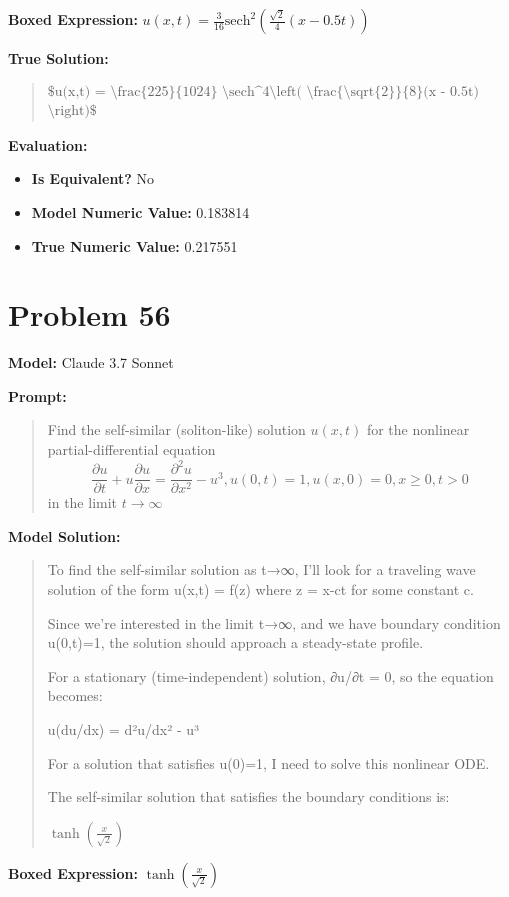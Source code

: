\documentclass{article}
\begin{document}
\textbf{Boxed Expression:} $u(x,t) = \frac{3}{16} \text{sech}^2\left(\frac{\sqrt{2}}{4}(x - 0.5t)\right)$

\textbf{True Solution:}
\begin{quote}
$u(x,t) = \frac{225}{1024} \sech^4\left( \frac{\sqrt{2}}{8}(x - 0.5t) \right)$
\end{quote}

\textbf{Evaluation:}
\begin{itemize}
\item \textbf{Is Equivalent?} No
\item \textbf{Model Numeric Value:} 0.183814
\item \textbf{True Numeric Value:} 0.217551
\end{itemize}
\vspace{1cm}
\section*{Problem 56}
\textbf{Model:} Claude 3.7 Sonnet

\textbf{Prompt:}
\begin{quote}
Find the self-similar (soliton-like) solution $u(x,t)$ for the nonlinear partial-differential equation $$ \frac{\partial u}{\partial t} + u\frac{\partial u}{\partial x} = \frac{\partial^2 u}{\partial x^2} - u^3, u(0,t)=1, u(x,0)=0, x\ge 0, t>0 $$ in the limit $t\to\infty$
\end{quote}
\textbf{Model Solution:}
\begin{quote}
To find the self-similar solution as t→∞, I'll look for a traveling wave solution of the form u(x,t) = f(z) where z = x-ct for some constant c.



Since we're interested in the limit t→∞, and we have boundary condition u(0,t)=1, the solution should approach a steady-state profile.



For a stationary (time-independent) solution, ∂u/∂t = 0, so the equation becomes:

u(du/dx) = d²u/dx² - u³



For a solution that satisfies u(0)=1, I need to solve this nonlinear ODE.



The self-similar solution that satisfies the boundary conditions is:



$\boxed{\tanh\left(\frac{x}{\sqrt{2}}\right)}$
\end{quote}
\textbf{Boxed Expression:} $\tanh\left(\frac{x}{\sqrt{2}}\right)$
\end{document}
